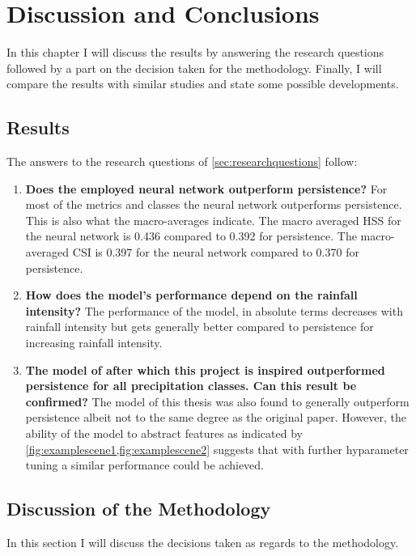 \chapter{Discussion and Conclusions}\label{chap4}
\thispagestyle{plain}
 In this chapter I will discuss the results by answering the research questions followed by a part on the decision taken for the methodology. Finally, I will compare the results with similar studies and state some possible developments.
\section{Results}

The answers to the research questions of \cref{sec:researchquestions} follow:
\begin{enumerate}
    \item \textbf{Does the employed neural network outperform persistence?} For most of the metrics and classes the neural network outperforms persistence. This is also what the macro-averages indicate. The macro averaged HSS for the neural network is 0.436 compared to 0.392 for persistence. The macro-averaged CSI is 0.397 for the neural network compared to 0.370 for persistence.
    \item \textbf{How does the model's performance depend on the rainfall intensity?} The performance of the model, in absolute terms decreases with rainfall intensity but gets generally better compared to persistence for increasing rainfall intensity.
    \item \textbf{The model of \citet{Agrawal2019MachineImages} after which this project is inspired outperformed persistence for all precipitation classes. Can this result be confirmed?}
    The model of this thesis was also found to generally outperform persistence albeit not to the same degree as the original paper. However, the ability of the model to abstract features as indicated by \cref{fig:examplescene1,fig:examplescene2} suggests that with further hyparameter tuning a similar performance could be achieved.
    \end{enumerate}



\section{Discussion of the Methodology}
In this section I will discuss the decisions taken as regards to the methodology.

